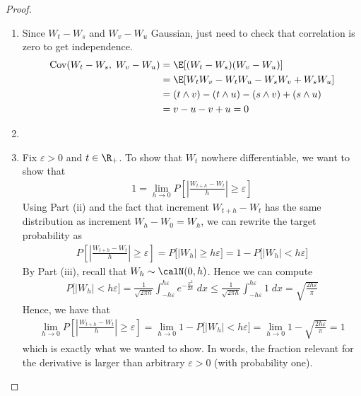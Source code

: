 \documentclass[12pt]{article}
\theoremstyle{plain}
\theoremstyle{definition}
\theoremstyle{remark}
\newcommand{\Cov}{\operatorname{Cov}}
\newcommand{\limh}{\lim_{h\rightarrow0}}
\begin{document}
\begin{proof}
\begin{enumerate}[label=(\roman*)]
  \item
    Since $W_t-W_s$ and $W_v-W_u$ Gaussian, just need to check that
    correlation is zero to get independence.
    \begin{align*}
      \Cov(W_t-W_s,\; W_v-W_u)
      &= \E[(W_t-W_s)(W_v-W_u)] \\
      &= \E[W_tW_v - W_tW_u - W_sW_v + W_sW_u] \\
      &= (t\wedge v) - (t\wedge u) - (s\wedge v) + (s\wedge u) \\
      &= v - u - v + u = 0
    \end{align*}
  \item
  \item
    Fix $\varepsilon>0$ and $t\in\R_+$.
    To show that $W_t$ nowhere differentiable, we want to show that
    \begin{align*}
      1=
      \limh
	    P\left[
        \left\lvert
        \frac{W_{t+h} - W_t}{h}
        \right\rvert \geq\varepsilon
      \right]
    \end{align*}
    Using Part (ii) and the fact that increment $W_{t+h}-W_t$ has the
    same distribution as increment $W_h-W_0=W_h$, we can rewrite
    the target probability as
    \begin{align*}
	    P\left[
        \left\lvert
        \frac{W_{t+h} - W_t}{h}
        \right\rvert \geq\varepsilon
      \right]
      =
	    P\big[
        \left\lvert
        W_{h}
        \right\rvert \geq h\varepsilon
      \big]
      =
      1-
      P\big[
        \left\lvert
        W_{h}
        \right\rvert < h\varepsilon
      \big]
    \end{align*}
    By Part (iii), recall that $W_h\sim\calN(0,h)$. Hence we can compute
    \begin{align*}
	    P\big[
        \left\lvert
        W_{h}
        \right\rvert < h\varepsilon
      \big]
      =
      \frac{1}{\sqrt{2\pi h}}
      \int_{-h\varepsilon}^{h\varepsilon}
	    e^{-\frac{x^2}{2h}} \;dx
      \leq
      \frac{1}{\sqrt{2\pi h}}
      \int_{-h\varepsilon}^{h\varepsilon}
	    1\;dx
      = \sqrt{\frac{2h\varepsilon}{\pi}}
    \end{align*}
    Hence, we have that
    \begin{align*}
      \limh
	    P\left[
        \left\lvert
        \frac{W_{t+h} - W_t}{h}
        \right\rvert \geq\varepsilon
      \right]
      =
      \limh 1-P\big[|W_h|<h\varepsilon\big]
      =\limh 1-\sqrt{\frac{2h\varepsilon}{\pi}}
      = 1
    \end{align*}
    which is exactly what we wanted to show.
    In words, the fraction relevant for the derivative is larger than
    arbitrary $\varepsilon>0$ (with probability one).

\end{enumerate}

\end{proof}
\end{document}
